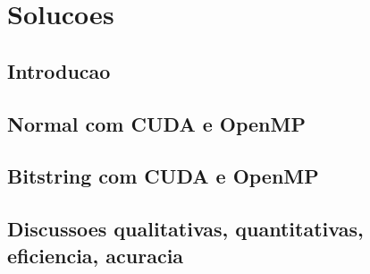 \chapter{Solucoes}
\label{CapSolucoes}

\section{Introducao}

\section{Normal com CUDA e OpenMP}

\section{Bitstring com CUDA e OpenMP}

\section{Discussoes qualitativas, quantitativas, eficiencia, acuracia}
